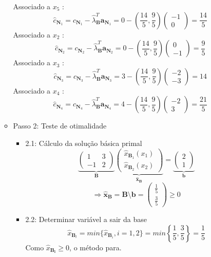 \documentclass{article}
\begin{document}
\begin{itemize}
\begin{itemize}
Associado a $x_{5}$ :
$$
\hat{c}_{\mathbf{N}_{1}}=c_{\mathbf{N}_{1}}-\hat{\lambda}_{\mathbf{B}}^{T} \mathbf{a}_{\mathbf{N}_{1}}=0-\left(\frac{14}{5},\frac{9}{5}\right)
\begin{pmatrix}
-1\\
0
\end{pmatrix}
=\frac{14}{5}
$$
Associado a $x_{2}$ :
$$
\hat{c}_{\mathbf{N}_{2}}=c_{\mathbf{N}_{2}}-\hat{\lambda}_{\mathbf{B}}^{T} \mathbf{a}_{\mathbf{N}_{2}}=0-\left(\frac{14}{5},\frac{9}{5}\right)
\begin{pmatrix}
0\\
-1
\end{pmatrix}
=\frac{9}{5}
$$
Associado a $x_{3}$ :
$$
\hat{c}_{\mathbf{N}_{3}}=c_{\mathbf{N}_{3}}-\hat{\lambda}_{\mathbf{B}}^{T} \mathbf{a}_{\mathbf{N}_{3}}=3-\left(\frac{14}{5},\frac{9}{5}\right)
\begin{pmatrix}
-2\\
-3
\end{pmatrix}
=14
$$
Associado a $x_{4}$ :
$$
\hat{c}_{\mathbf{N}_{4}}=c_{\mathbf{N}_{4}}-\hat{\lambda}_{\mathbf{B}}^{T} \mathbf{a}_{\mathbf{N}_{4}}=4-\left(\frac{14}{5},\frac{9}{5}\right)
\begin{pmatrix}
-2\\
3
\end{pmatrix}
=\frac{21}{5}
$$
\item Passo 2: Teste de otimalidade
\begin{itemize}
\item 2.1: Cálculo da solução básica primal
\[
\underbrace{
\begin{pmatrix}
1&3\\
-1&2
\end{pmatrix}}_{\mathbf{B}}
\underbrace{
\begin{pmatrix}
\hat{x}_{\mathbf{B}_1} (x_1)\\
\hat{x}_{\mathbf{B}_2} (x_2)
\end{pmatrix}}_{\mathbf{\hat{x}_\mathbf{B}}}
=
\underbrace{
\begin{pmatrix}
2\\
1
\end{pmatrix}}_{\mathbf{b}}
\]
\[
\Rightarrow \mathbf{\hat{x}_\mathbf{B}} = \mathbf{B} \setminus \mathbf{b} =
\begin{pmatrix}
\frac{1}{5}\\
\frac{3}{5}
\end{pmatrix}
\geq 0
\]
\item 2.2: Determinar variável a sair da base\\
\[
\hat{x}_{\mathbf{B}_l}=min\{ \hat{x}_{\mathbf{B}_i}, i=1,2\}=min\left\{\frac{1}{5}, \frac{3}{5}\right\}=\frac{1}{5}
\]
Como $\hat{x}_\mathbf{B_l}\geq0$, o método para.
		\end{itemize}
		
	\end{itemize}
	\end{itemize}	
\end{document}

